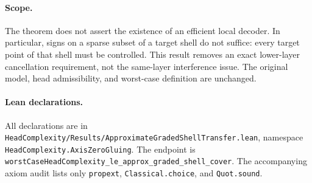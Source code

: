 \documentclass{article}
\begin{document}
\paragraph{Scope.}
The theorem does not assert the existence of an efficient local decoder. In
particular, signs on a sparse subset of a target shell do not suffice: every
target point of that shell must be controlled. This result removes an exact
lower-layer cancellation requirement, not the same-layer interference issue.
The original model, head admissibility, and worst-case definition are unchanged.

\paragraph{Lean declarations.}
All declarations are in
\texttt{HeadComplexity/Results/ApproximateGradedShellTransfer.lean}, namespace
\texttt{HeadComplexity.AxisZeroGluing}. The endpoint is
\texttt{worstCaseHeadComplexity\_le\_approx\_graded\_shell\_cover}.
The accompanying axiom audit lists only
\texttt{propext}, \texttt{Classical.choice}, and \texttt{Quot.sound}.
\end{document}
